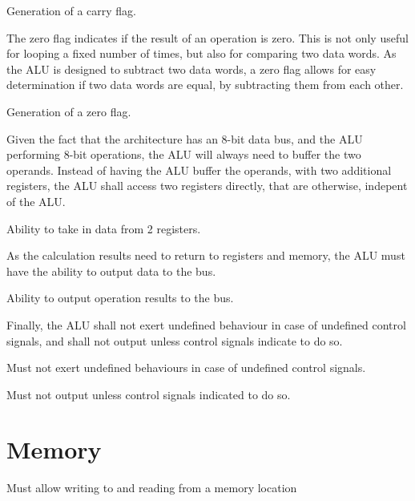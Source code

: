 \begin{turing-requirement}
  Generation of a carry flag. 
\end{turing-requirement}

The zero flag indicates if the result of an operation is zero. This is not only useful for looping a fixed number of times, but also for comparing two data words. As the ALU is designed to subtract two data words, a zero flag allows for easy determination if two data words are equal, by subtracting them from each other. 

\begin{feat-requirement}
  Generation of a zero flag.
\end{feat-requirement}

Given the fact that the architecture has an 8-bit data bus, and the ALU performing 8-bit operations, the ALU will always need to buffer the two operands. Instead of having the ALU buffer the operands, with two additional registers, the ALU shall access two registers directly, that are otherwise, indepent of the ALU.
\begin{arch-requirement}
  Ability to take in data from 2 registers.
\end{arch-requirement}

As the calculation results need to return to registers and memory, the ALU must have the ability to output data to the bus.
\begin{arch-requirement}
  Ability to output operation results to the bus. 
\end{arch-requirement}

Finally, the ALU shall not exert undefined behaviour in case of undefined control signals, and shall not output unless control signals indicate to do so. 

\begin{feat-requirement} \label{req:alu-undef-behavior}
  Must not exert undefined behaviours in case of undefined control signals. 
\end{feat-requirement}

\begin{feat-requirement} \label{req:alu-no-output}
  Must not output unless control signals indicated to do so. 
\end{feat-requirement}

\section{Memory}

\begin{turing-requirement}
Must allow writing to and reading from a memory location
\end{turing-requirement}

